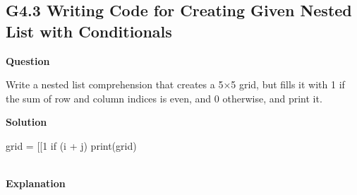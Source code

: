 \documentclass[10pt]{extarticle}
\begin{document}
\subsection*{G4.3 Writing Code for Creating Given Nested List with Conditionals}

\textbf{Question}

Write a nested list comprehension that creates a 5×5 grid, but fills it with 1 if the sum of row and column indices is even, and 0 otherwise, and print it.

\noindent\textbf{Solution}

\begin{python}
grid = [[1 if (i + j) %
print(grid)
\end{python}  \\

\noindent\textbf{Explanation}
\end{document}
